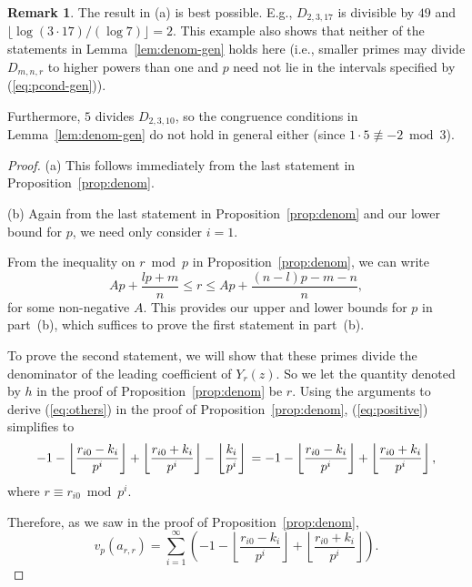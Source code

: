 \documentclass{jT}
\theoremstyle{definition}
\newtheorem*{remark}{Remark}
\begin{document}
\begin{remark}
The result in (a) is best possible. E.g., $D_{2,3,17}$ is divisible by $49$
and $\lfloor \log (3 \cdot 17)/(\log 7) \rfloor =2$. This example also shows
that neither of the statements in Lemma~\ref{lem:denom-gen} holds here
(i.e., smaller primes may divide $D_{m,n,r}$ to higher powers than one
and $p$ need not lie in the intervals specified by (\ref{eq:pcond-gen})).

Furthermore, $5$ divides $D_{2,3,10}$, so the congruence
conditions in Lemma~\ref{lem:denom-gen} do not hold in general either
(since $1 \cdot 5 \not\equiv -2 \bmod 3$).
\end{remark}

\begin{proof}
(a) This follows immediately from the last statement in Proposition~\ref{prop:denom}.

(b) Again from the last statement in Proposition~\ref{prop:denom} and our
lower bound for $p$, we need only consider $i=1$.

From the inequality on $r \bmod p$ in Proposition~\ref{prop:denom},
we can write
\begin{equation}
\label{eq:rmodp-gen}
Ap + \frac{lp+m}{n} \leq r \leq Ap + \frac{(n-l)p-m-n}{n},
\end{equation}
for some non-negative $A$. This provides our upper and lower bounds
for $p$ in part~(b), which suffices to prove the  first statement
in part~(b). 

To prove the second statement, we will show that these primes divide
the denominator of the leading coefficient of $Y_{r}(z)$. So we let
the quantity denoted by $h$ in the proof of Proposition~\ref{prop:denom}
be $r$. Using the arguments to derive (\ref{eq:others}) in the proof
of Proposition~\ref{prop:denom}, (\ref{eq:positive}) simplifies to
\begin{displaymath}
-1 - \left\lfloor \frac{r_{i0}-k_{i}}{p^{i}} \right\rfloor
+ \left\lfloor \frac{r_{i0}+k_{i}}{p^{i}} \right\rfloor - \left\lfloor \frac{k_{i}}{p^{i}} \right\rfloor \\
= -1 - \left\lfloor \frac{r_{i0}-k_{i}}{p^{i}} \right\rfloor + \left\lfloor \frac{r_{i0}+k_{i}}{p^{i}} \right\rfloor,
\end{displaymath}
where $r \equiv r_{i0} \bmod p^{i}$.

Therefore, as we saw in the proof of Proposition~\ref{prop:denom},
\begin{displaymath}
v_{p}(a_{r,r}) = \sum_{i=1}^{\infty} \left( -1 - \left\lfloor \frac{r_{i0}-k_{i}}{p^{i}} \right\rfloor
                                            + \left\lfloor \frac{r_{i0}+k_{i}}{p^{i}} \right\rfloor \right).
\end{displaymath}


\end{proof}
\end{document}
